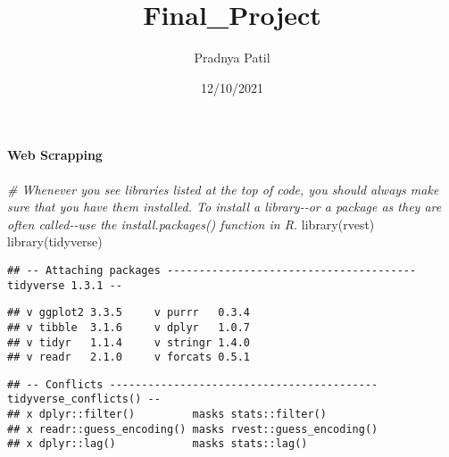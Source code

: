 \documentclass[
]{article}
\title{Final\_Project}
\author{Pradnya Patil}
\date{12/10/2021}
\newenvironment{Shaded}{\begin{snugshade}}{\end{snugshade}}
\newcommand{\CommentTok}[1]{\textcolor[rgb]{0.56,0.35,0.01}{\textit{#1}}}
\newcommand{\FunctionTok}[1]{\textcolor[rgb]{0.00,0.00,0.00}{#1}}
\newcommand{\NormalTok}[1]{#1}
\begin{document}
\maketitle

\hypertarget{web-scrapping}{%
\paragraph{Web Scrapping}\label{web-scrapping}}

\begin{Shaded}
\begin{Highlighting}[]
\CommentTok{\# Whenever you see libraries listed at the top of code, you should always make sure that you have them installed. To install a library{-}{-}or a \textquotesingle{}package\textquotesingle{} as they are often called{-}{-}use the install.packages() function in R.}
\FunctionTok{library}\NormalTok{(rvest)}
\FunctionTok{library}\NormalTok{(tidyverse)}
\end{Highlighting}
\end{Shaded}

\begin{verbatim}
## -- Attaching packages --------------------------------------- tidyverse 1.3.1 --
\end{verbatim}

\begin{verbatim}
## v ggplot2 3.3.5     v purrr   0.3.4
## v tibble  3.1.6     v dplyr   1.0.7
## v tidyr   1.1.4     v stringr 1.4.0
## v readr   2.1.0     v forcats 0.5.1
\end{verbatim}

\begin{verbatim}
## -- Conflicts ------------------------------------------ tidyverse_conflicts() --
## x dplyr::filter()         masks stats::filter()
## x readr::guess_encoding() masks rvest::guess_encoding()
## x dplyr::lag()            masks stats::lag()
\end{verbatim}
\end{document}
